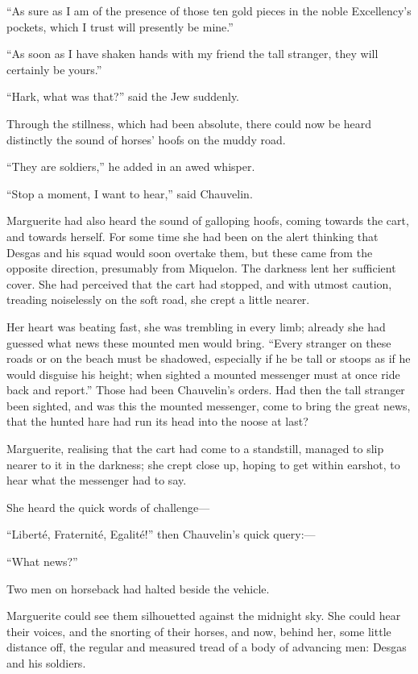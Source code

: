 \documentclass[paper=5.5in:8.5in,BCOR=7mm,twoside,DIV=calc,12pt,usegeometry,chapterprefix,endperiod,headings=big]{scrbook}
\begin{document}
\enquote{As sure as I am of the presence of those ten gold pieces in the noble Excellency's pockets, which I trust will presently be mine.}

\enquote{As soon as I have shaken hands with my friend the tall stranger, they will certainly be yours.}

\enquote{Hark, what was that?} said the Jew suddenly.

Through the stillness, which had been absolute, there could now be heard distinctly the sound of horses’ hoofs on the muddy road.

\enquote{They are soldiers,} he added in an awed whisper.

\enquote{Stop a moment, I want to hear,} said Chauvelin.

Marguerite had also heard the sound of galloping hoofs, coming towards the cart, and towards herself. For some time she had been on the alert thinking that Desgas and his squad would soon overtake them, but these came from the opposite direction, presumably from Miquelon. The darkness lent her sufficient cover. She had perceived that the cart had stopped, and with utmost caution, treading noiselessly on the soft road, she crept a little nearer.

Her heart was beating fast, she was trembling in every limb; already she had guessed what news these mounted men would bring. \enquote{Every stranger on these roads or on the beach must be shadowed, especially if he be tall or stoops as if he would disguise his height; when sighted a mounted messenger must at once ride back and report.} Those had been Chauvelin's orders. Had then the tall stranger been sighted, and was this the mounted messenger, come to bring the great news, that the hunted hare had run its head into the noose at last?

Marguerite, realising that the cart had come to a standstill, managed to slip nearer to it in the darkness; she crept close up, hoping to get within earshot, to hear what the messenger had to say.

She heard the quick words of challenge---

\enquote{Liberté, Fraternité, Egalité!} then Chauvelin's quick query:---

\enquote{What news?}

Two men on horseback had halted beside the vehicle.

Marguerite could see them silhouetted against the midnight sky. She could hear their voices, and the snorting of their horses, and now, behind her, some little distance off, the regular and measured tread of a body of advancing men: Desgas and his soldiers.
\end{document}
